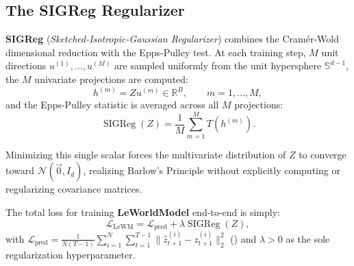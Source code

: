 \documentclass[11pt, oneside, openany]{book}
\DeclareMathOperator{\SIGReg}{SIGReg}
\begin{document}
\subsection{The SIGReg Regularizer}
\label{sec:7.3.2}

\textbf{SIGReg} (\textit{Sketched-Isotropic-Gaussian Regularizer}) combines the Cram\'er-Wold dimensional reduction with the Epps-Pulley test. At each training step, $M$ unit directions $u^{(1)}, \dots, u^{(M)}$ are sampled uniformly from the unit hypersphere $\mathbb{S}^{d-1}$, the $M$ univariate projections are computed:
\begin{equation}
\label{eq:7.8}
h^{(m)} = Z u^{(m)} \in \mathbb{R}^{B}, \qquad m = 1, \dots, M,
\end{equation}
and the Epps-Pulley statistic is averaged across all $M$ projections:
\begin{equation}
\label{eq:7.9}
\SIGReg(Z) = \frac{1}{M} \sum_{m=1}^{M} T\left(h^{(m)}\right).
\end{equation}

Minimizing this single scalar forces the multivariate distribution of $Z$ to converge toward $\mathcal{N}(\vec{0}, I_{d})$, realizing Barlow's Principle without explicitly computing or regularizing covariance matrices.

The total loss for training \textbf{LeWorldModel} end-to-end is simply:
\begin{equation}
\label{eq:7.10}
\mathcal{L}_{\text{LeWM}} = \mathcal{L}_{\text{pred}} + \lambda \SIGReg(Z),
\end{equation}
with $\mathcal{L}_{\text{pred}} = \frac{1}{N(T - 1)}\sum_{i=1}^{N}\sum_{t=1}^{T-1} \lVert \hat{z}_{t+1}^{(i)} - z_{t+1}^{(i)} \rVert_{2}^{2}$ () and $\lambda > 0$ as the sole regularization hyperparameter.
\end{document}

